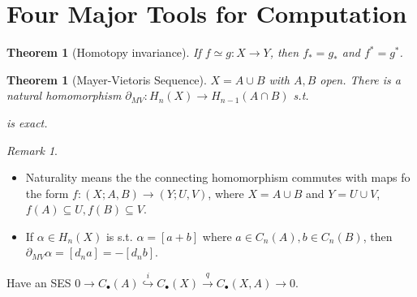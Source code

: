 \documentclass{article}
\theoremstyle{definition}
\theoremstyle{remark}
\newtheorem{rem}{Remark}
\theoremstyle{plain}
\newtheorem{thm}[defn]{Theorem}
\begin{document}
\section{Four Major Tools for Computation}
\begin{thm}[Homotopy invariance] If $f\simeq g:X\to Y$, then $f_\ast=g_\ast$ and $f^\ast=g^\ast$.
\end{thm}
\begin{thm}[Mayer-Vietoris Sequence]
    $X=A\cup B$ with $A,B$ open. There is a natural homomorphism $\partial_{MV}:H_n(X)\to H_{n-1}(A\cap B)$ s.t.
    \begin{center}
    \end{center}
    is exact.
\end{thm}
\begin{rem}
    \begin{itemize}
        \item Naturality means the the connecting homomorphism commutes with maps fo the form $f:(X;A,B)\to (Y;U,V)$, where $X=A\cup B$ and $Y=U\cup V$, $f(A)\subseteq U, f(B)\subseteq V$.
        \item If $\alpha\in H_n(X)$ is s.t. $\alpha=[a+b]$ where $a\in C_n(A), b\in C_n(B)$, then $\partial_{MV}\alpha=[d_na]=-[d_nb]$.
    \end{itemize}
\end{rem}
Have an SES $0\to C_\bullet(A)\overset{i}{\hookrightarrow} C_\bullet(X)\overset{q}{\to}C_\bullet(X,A)\to 0$.
\end{document}
